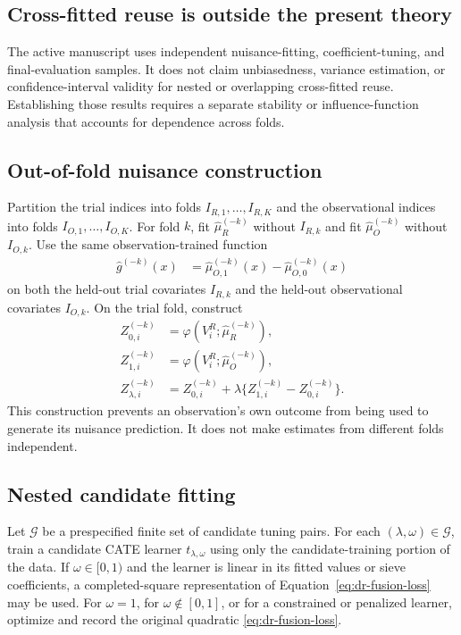 \subsection{Cross-fitted reuse is outside the present theory}

The active manuscript uses independent nuisance-fitting, coefficient-tuning,
and final-evaluation samples. It does not claim unbiasedness, variance
estimation, or confidence-interval validity for nested or overlapping
cross-fitted reuse. Establishing those results requires a separate stability
or influence-function analysis that accounts for dependence across folds.

\subsection{Out-of-fold nuisance construction}

Partition the trial indices into folds $I_{R,1},\ldots,I_{R,K}$ and the observational indices into folds $I_{O,1},\ldots,I_{O,K}$. For fold $k$, fit $\widehat\mu_R^{(-k)}$ without $I_{R,k}$ and fit $\widehat\mu_O^{(-k)}$ without $I_{O,k}$. Use the same observation-trained function
\begin{align}
\widehat{g}^{(-k)}(x)
&=
\widehat\mu_{O,1}^{(-k)}(x)
-
\widehat\mu_{O,0}^{(-k)}(x)
\end{align}
on both the held-out trial covariates $I_{R,k}$ and the held-out observational covariates $I_{O,k}$. On the trial fold, construct
\begin{align}
Z_{0,i}^{(-k)}
&=
\varphi(V_i^R;\widehat\mu_R^{(-k)}),
\\
Z_{1,i}^{(-k)}
&=
\varphi(V_i^R;\widehat\mu_O^{(-k)}),
\\
Z_{\lambda,i}^{(-k)}
&=
Z_{0,i}^{(-k)}
+
\lambda
\{Z_{1,i}^{(-k)}-Z_{0,i}^{(-k)}\}.
\end{align}
This construction prevents an observation's own outcome from being used to generate its nuisance prediction. It does not make estimates from different folds independent.

\subsection{Nested candidate fitting}

Let $\mathcal G$ be a prespecified finite set of candidate tuning pairs. For each $(\lambda,\omega)\in\mathcal G$, train a candidate CATE learner $t_{\lambda,\omega}$ using only the candidate-training portion of the data. If $\omega\in[0,1)$ and the learner is linear in its fitted values or sieve coefficients, a completed-square representation of Equation~\eqref{eq:dr-fusion-loss} may be used. For $\omega=1$, for $\omega\notin[0,1]$, or for a constrained or penalized learner, optimize and record the original quadratic \eqref{eq:dr-fusion-loss}.

